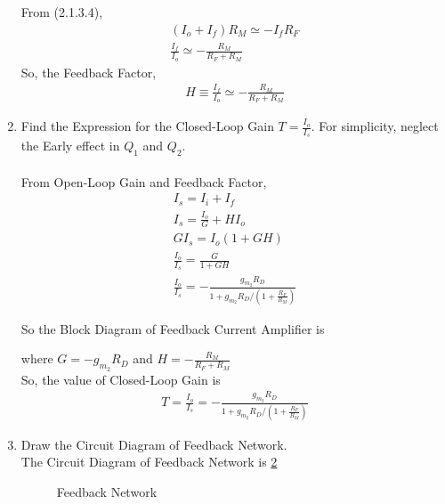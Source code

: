 \begin{enumerate}[label=\thesubsection.\arabic*.,ref=\thesubsection.\theenumi]
From (2.1.3.4),
\begin{align}
(I_{o} + I_{f})R_{M} \simeq -I_{f}R_{F}\\
\frac{I_{f}}{I_{o}} \simeq -\frac{R_{M}}{R_{F}+R_{M}}
\end{align}
So, the Feedback Factor,
\begin{align}
H \equiv \frac{I_{f}}{I_{o}} \simeq-\frac{R_{M}}{R_{F}+R_{M}}
\end{align}
\item Find the Expression for the Closed-Loop Gain $T=\frac{I_{o}}{I_{s}}$. For simplicity, neglect the Early effect in $Q_{1}$ and $Q_{2}$.\\
\solution \\
From Open-Loop Gain and Feedback Factor,
\begin{align}
I_{s} = I_{i} + I_{f}\\
I_{s} = \frac{I_{o}}{G} + H I_{o}\\
GI_{s} = I_{o}(1+GH)\\
\frac{I_{o}}{I_{s}} = \frac{G}{1+GH}\\
\frac{I_{o}}{I_{s}}=-\frac{g_{m_{2}} R_{D}}{1+g_{m_{2}} R_{D} /\left(1+\frac{R_{F}}{R_{M}}\right)}
\end{align}

So the Block Diagram of Feedback Current Amplifier is
\begin{figure}[ht!]
	\begin{center}
		\resizebox{\columnwidth}{!}{}
	\end{center}
	\caption{}
	\label{fig:Control_System}
\end{figure}

where $G = -g_{m_{2}} R_{D}$ and $H = -\frac{R_{M}}{R_{F}+R_{M}}$\\

So, the value of Closed-Loop Gain is
\begin{align}
T = \frac{I_{o}}{I_{s}}=-\frac{g_{m_{2}} R_{D}}{1+g_{m_{2}} R_{D} /\left(1+\frac{R_{F}}{R_{M}}\right)}
\end{align}

\item Draw the Circuit Diagram of Feedback Network.\\
\solution
The Circuit Diagram of Feedback Network is \ref{fig:Feedback_Network}
\begin{figure}[ht!]
	\begin{center}
		\resizebox{\columnwidth/2}{!}{}
	\end{center}
	\caption{Feedback Network}
	\label{fig:Feedback_Network}
\end{figure}


\end{enumerate}
